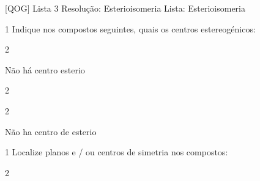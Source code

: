 \documentclass[\mainfilename]{subfiles}
\begin{document}
[QOG]
{Lista 3 Resolução: Esterioisomeria} %
{Lista: Esterioisomeria} %

\begin{questionBox}1{ %
    Indique nos compostos seguintes, quais os centros estereogénicos:
} %
    
\end{questionBox}


\begin{questionBox}2{ %
} %

    \begin{center}
    \end{center}

    Não há centro esterio
\end{questionBox}

\begin{questionBox}2{ %
} %

    \begin{center}
    \end{center}

\end{questionBox}

\begin{questionBox}2{ %
} %

    \begin{center}
    \end{center}

    Não ha centro de esterio

\end{questionBox}

\begin{questionBox}1{ %
    Localize planos e / ou centros de simetria nos compostos:
} %
\end{questionBox}

\begin{questionBox}2{ %
} %
    
    \begin{center}
    \end{center}

\end{questionBox}
\end{document}
